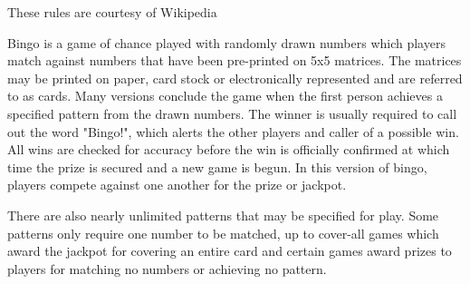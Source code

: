 
These rules are courtesy of Wikipedia\cite{website:bingo rules} %

Bingo is a game of chance played with randomly drawn numbers which players match against numbers that have been pre-printed on 5x5 matrices. The matrices may be printed on paper, card stock or electronically represented and are referred to as cards. Many versions conclude the game when the first person achieves a specified pattern from the drawn numbers. The winner is usually required to call out the word "Bingo!", which alerts the other players and caller of a possible win. All wins are checked for accuracy before the win is officially confirmed at which time the prize is secured and a new game is begun. In this version of bingo, players compete against one another for the prize or jackpot.

There are also nearly unlimited patterns that may be specified for play. Some patterns only require one number to be matched, up to cover-all games which award the jackpot for covering an entire card and certain games award prizes to players for matching no numbers or achieving no pattern.


